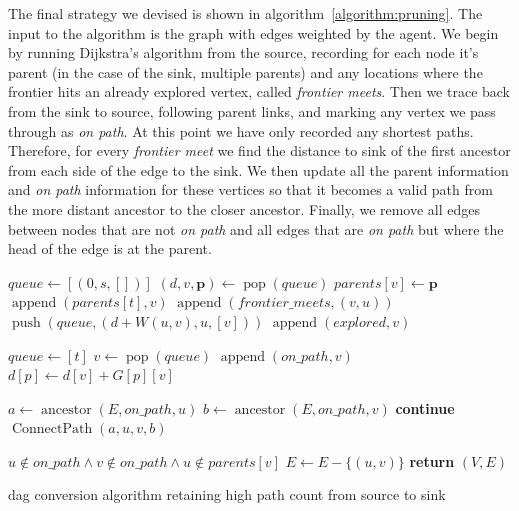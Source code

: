 The final strategy we devised is shown in algorithm~\ref{algorithm:pruning}. The input to the algorithm is the graph with edges weighted by the agent. We begin by running Dijkstra's algorithm from the source, recording for each node it's parent (in the case of the sink, multiple parents) and any locations where the frontier hits an already explored vertex, called \emph{frontier meets}. Then we trace back from the sink to source, following parent links, and marking any vertex we pass through as \emph{on path}. At this point we have only recorded any shortest paths. Therefore, for every \emph{frontier meet} we find the distance to sink of the first ancestor from each side of the edge to the sink. We then update all the parent information and \emph{on path} information for these vertices so that it becomes a valid path from the more distant ancestor to the closer ancestor. Finally, we remove all edges between nodes that are not \emph{on path} and all edges that are \emph{on path} but where the head of the edge is at the parent.

\begin{algorithm}[t]
\small
\begin{algorithmic}
  \State $queue \gets [(0, s, [])]$
    \State $(d, v, \bm{p}) \gets \operatorname{pop}(queue)$
    \State $parents[v] \gets \bm{p}$
        \State $\operatorname{append}(parents[t], v)$
        \State $\operatorname{append}(frontier\_meets, (v, u))$
      \Else
        \State $\operatorname{push}(queue, (d + W(u,v), u, [v]))$
      \EndIf
    \EndFor
    \State $\operatorname{append}(explored, v)$
  \EndWhile

  \State $queue \gets [t]$
    \State $v \gets \operatorname{pop}(queue)$
    \State $\operatorname{append}(on\_path, v)$
      \State $d[p] \gets d[v] + G[p][v]$
    \EndFor
  \EndWhile

    \State $a \gets \operatorname{ancestor}(E, on\_path, u)$
    \State $b \gets \operatorname{ancestor}(E, on\_path, v)$
      \State \textbf{continue}
    \EndIf
    \State $\operatorname{ConnectPath}(a, u, v, b)$
  \EndFor

    \If $u \notin on\_path \wedge v \notin on\_path \wedge u \notin parents[v]$
      \State $E \gets E - \{(u, v)\}$
    \EndIf
  \EndFor
  \State \textbf{return} $(V, E)$
\EndFunction
\end{algorithmic}
\caption{\ac{dag} conversion algorithm retaining high path count from source to sink}
\label{algorithm:pruning}
\end{algorithm}

